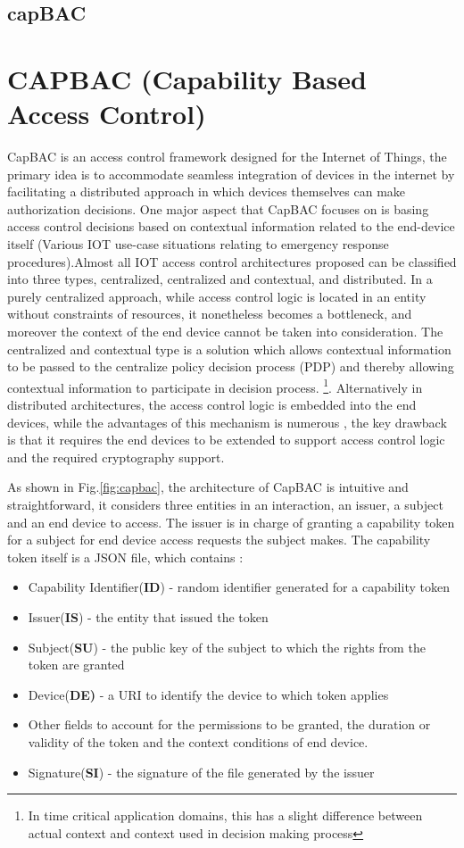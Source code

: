 \subsection{capBAC}
\label{subsec:capbacsystem}

\section{CAPBAC (Capability Based Access Control)}
CapBAC\cite{hernandez2013distributed} is an access control framework designed for the Internet of Things, the primary idea is to accommodate seamless integration of devices in the internet by facilitating a distributed approach in which devices themselves can make 
authorization decisions.
One major aspect that CapBAC focuses on is basing access control decisions based on contextual information related to the end-device itself (Various IOT use-case situations relating to emergency response procedures).Almost all IOT access control architectures proposed can be classified into three types, centralized, centralized and contextual, and distributed. In a purely centralized approach, while access control logic is located in an entity without constraints of resources, it nonetheless becomes a bottleneck, and moreover the context of the end device cannot be taken into consideration. The centralized and contextual type is a solution which allows contextual information to be passed to the centralize policy decision process (PDP) and thereby allowing contextual information to participate in decision process. \footnote{In time critical application domains, this has a slight difference between actual context and context used in decision making process}. Alternatively in distributed architectures, the access control logic is embedded into the end devices, while the advantages of this mechanism is numerous , the key drawback is that it requires the end devices to be extended to support access control logic and the required cryptography support.

As shown in Fig.\ref{fig:capbac}, the architecture of CapBAC is intuitive and straightforward, it considers three entities in an interaction, an issuer, a subject and an end device to access. The issuer is in charge of granting a capability token for a subject for end device access requests the subject makes. The capability token itself is a JSON file, which contains :
\begin{itemize}
\item Capability Identifier(\textbf{ID}) - random identifier generated for a capability token
\item Issuer(\textbf{IS}) - the entity that issued the token
\item Subject(\textbf{SU}) - the public key of the subject to which the rights from the token are granted
\item Device(\textbf{DE)} - a URI to identify the device to which token applies  
\item Other fields to account for the permissions to be granted, the duration or validity of the token and the context conditions of end device. 
\item Signature(\textbf{SI}) - the signature of the file generated by the issuer
\end{itemize}

